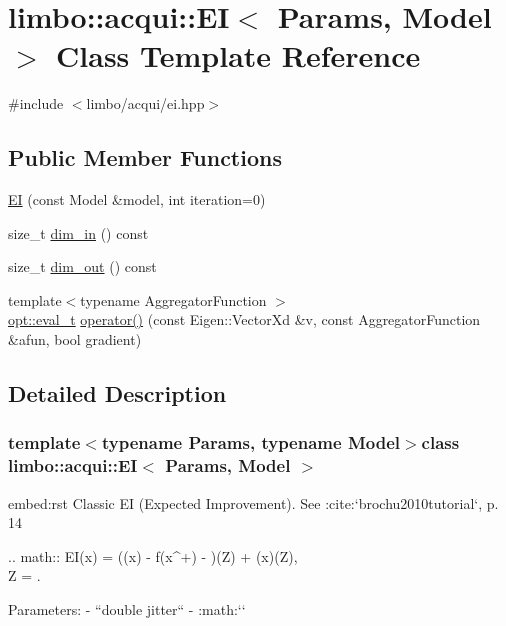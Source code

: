 \hypertarget{classlimbo_1_1acqui_1_1_e_i}{}\section{limbo\+:\+:acqui\+:\+:E\+I$<$ Params, Model $>$ Class Template Reference}
\label{classlimbo_1_1acqui_1_1_e_i}


{\ttfamily \#include $<$limbo/acqui/ei.\+hpp$>$}

\subsection*{Public Member Functions}
\begin{DoxyCompactItemize}
\item 
\hyperlink{classlimbo_1_1acqui_1_1_e_i_aa1e8c3ae70c75d10adf188e0c260a03a}{E\+I} (const Model \&model, int iteration=0)
\item 
size\+\_\+t \hyperlink{classlimbo_1_1acqui_1_1_e_i_a52d965602aa60609e3f4f447dbea285b}{dim\+\_\+in} () const 
\item 
size\+\_\+t \hyperlink{classlimbo_1_1acqui_1_1_e_i_a7b030343c6dae9af80853cfab0868e8d}{dim\+\_\+out} () const 
\item 
{\footnotesize template$<$typename Aggregator\+Function $>$ }\\\hyperlink{group__opt__tools_ga362b55973a38ac71f27a06f9d9c14f24}{opt\+::eval\+\_\+t} \hyperlink{classlimbo_1_1acqui_1_1_e_i_a02e0c42197cd45d6b6bb1dc9c91af06d}{operator()} (const Eigen\+::\+Vector\+Xd \&v, const Aggregator\+Function \&afun, bool gradient)
\end{DoxyCompactItemize}


\subsection{Detailed Description}
\subsubsection*{template$<$typename Params, typename Model$>$class limbo\+::acqui\+::\+E\+I$<$ Params, Model $>$}

\begin{DoxyVerb}embed:rst
Classic EI (Expected Improvement). See :cite:`brochu2010tutorial`, p. 14

  .. math::
    EI(x) = (\mu(x) - f(x^+) - \xi)\Phi(Z) + \sigma(x)\phi(Z),\\ Z = .

Parameters:
  - ``double jitter`` - :math:`\xi`
\end{DoxyVerb}
 

